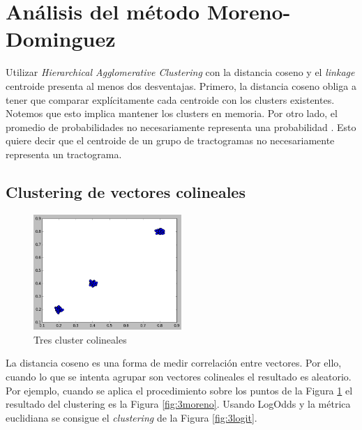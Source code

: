 \section{An\'alisis del m\'etodo Moreno-Dominguez}

Utilizar \textit{Hierarchical Agglomerative Clustering} con la distancia 
coseno y el \textit{linkage} centroide presenta al menos dos desventajas. 
Primero, la distancia coseno obliga a tener que comparar expl\'icitamente cada
centroide con los clusters existentes. Notemos que esto implica mantener los
clusters en memoria. Por otro lado, el promedio de probabilidades no
necesariamente representa una probabilidad \cite{Pohl2007}. Esto quiere decir
que el centroide de un grupo de tractogramas no necesariamente representa un
tractograma. \\

\subsection{Clustering de vectores colineales}

\begin{figure}[h!]
        \centering
        \includegraphics[width=0.5\textwidth]{img/3pop.png}
        \caption{Tres cluster colineales\-}
        \label{fig:3clusters}
\end{figure}

La distancia coseno es una forma de medir co\-rrelaci\'on entre vectores. Por ello,
cuando lo que se intenta agrupar son vectores colineales el resultado es aleatorio.
Por ejemplo, cuando se aplica el procedimiento sobre los puntos de la Figura
\ref{fig:3clusters} el resultado del clustering es la Figura \ref{fig:3moreno}.
Usando LogOdds y la m\'etrica euclidiana se consigue el \textit{clustering} de 
la Figura \ref{fig:3logit}.\\

